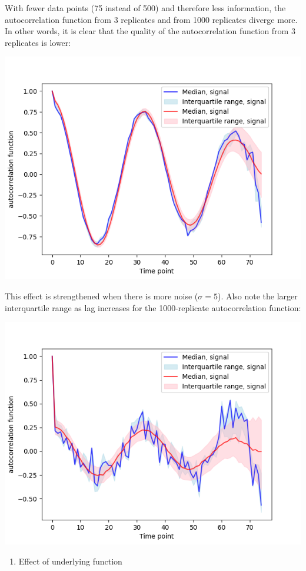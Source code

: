 \begin{enumerate}
\begin{enumerate}
\begin{enumerate}
With fewer data points (75 instead of 500) and therefore less information, the autocorrelation function from 3 replicates and from 1000 replicates diverge more.  In other words, it is clear that the quality of the autocorrelation function from 3 replicates is lower:
\begin{center}
\includegraphics[width=.9\linewidth]{nonstat_3vs1000rep_shorter.png}
\end{center}

This effect is strengthened when there is more noise (\(\sigma = 5\)).  Also note the larger interquartile range as lag increases for the 1000-replicate autocorrelation function:
\begin{center}
\includegraphics[width=.9\linewidth]{nonstat_3vs1000rep_shorter_noisier.png}
\end{center}

\begin{enumerate}
\item Effect of underlying function
\label{sec:orgb7bbe3a}


\end{enumerate}
\end{enumerate}
\end{enumerate}
\end{enumerate}
